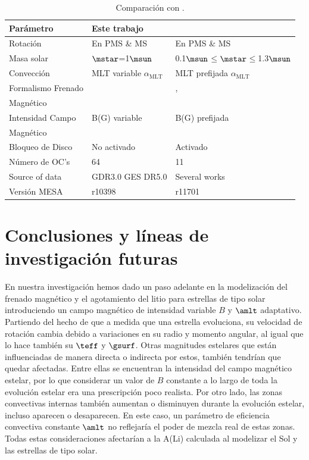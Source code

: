 \begin{table}
	\centering
	\begin{threeparttable}
		\begin{tabular}{lll} 
			\hline
			Parámetro & Este trabajo & \cite{Gossage2021}\\
			\hline
			
			Rotación & En PMS \& MS & En PMS \& MS\\
			Masa solar & $\mstar$=1$\msun$ & 0.1$\msun$$\le$$\mstar$$\le$1.3$\msun$ \\
			Convección & MLT variable $\alpha_{\textrm{MLT}}$ & MLT prefijada $\alpha_{\textrm{MLT}}$\\
			Formalismo Frenado & \cite{Gallet2013} & \cite{Matt2015}, \\ Magnético & & \cite{Garraffo2018}\\
			Intensidad Campo & B(G) variable & B(G) prefijada\\ Magnético & & \\
			Bloqueo de Disco & No activado & Activado\\
			Número de OC's & 64 & 11 \\
			Source of data & GDR3.0 GES DR5.0 & Several works \\
			Versión MESA & r10398 & r11701\\
			\hline
		\end{tabular}
	\end{threeparttable}
	\caption{Comparación con \cite{Gossage2021}.}\label{tab:gassage_vs_navarro}    
\end{table}

\section{Conclusiones y líneas de investigación futuras} \label{sec_conclusions}
En nuestra investigación hemos dado un paso adelante en la modelización del frenado magnético y el agotamiento del litio para estrellas de tipo solar introduciendo un campo magnético de intensidad variable $B$ y $\amlt$ adaptativo. Partiendo del hecho de que a medida que una estrella evoluciona, su velocidad de rotación cambia debido a variaciones en su radio y momento angular, al igual que lo hace también su $\teff$ y $\gsurf$. Otras magnitudes estelares que están influenciadas de manera directa o indirecta por estos, también tendrían que quedar afectadas. Entre ellas se encuentran la intensidad del campo magnético estelar, por lo que considerar un valor de $B$ constante a lo largo de toda la evolución estelar era una prescripción poco realista. Por otro lado, las zonas convectivas internas también aumentan o disminuyen durante la evolución estelar, incluso aparecen o desaparecen. En este caso, un parámetro de eficiencia convectiva constante $\amlt$ no reflejaría el poder de mezcla real de estas zonas. Todas estas consideraciones afectarían a la A(Li) calculada al modelizar el Sol y las estrellas de tipo solar.\par

